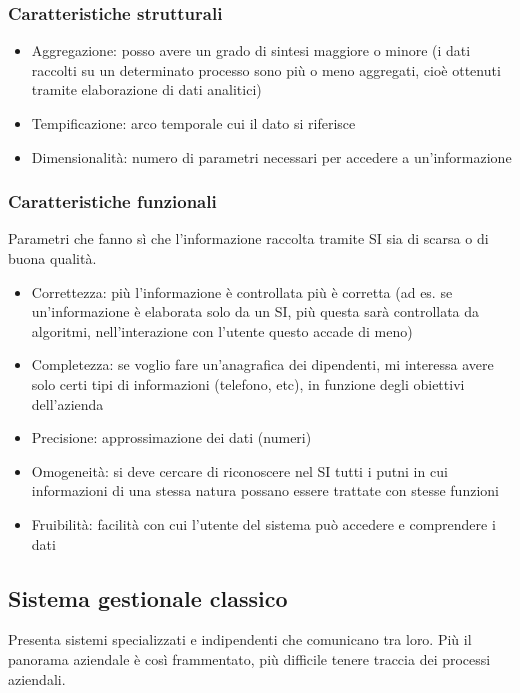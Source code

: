 \begin{itemize}
\subsubsection{Caratteristiche strutturali}
\label{subs:Caratteristiche strutturali}
\begin{itemize}
  \item Aggregazione: posso avere un grado di sintesi maggiore o minore
  (i dati raccolti su un determinato processo sono pi\`u o meno aggregati,
  cio\`e ottenuti tramite elaborazione di dati analitici)
  \item Tempificazione: arco temporale cui il dato si riferisce
  \item Dimensionalit\`a: numero di parametri necessari per accedere
  a un'informazione
\end{itemize}
\subsubsection{Caratteristiche funzionali}
\label{subs:Caratteristiche funzionali}
Parametri che fanno s\`i che l'informazione raccolta tramite SI sia di scarsa
o di buona qualit\`a.
\begin{itemize}
  \item Correttezza: pi\`u l'informazione \`e controllata pi\`u \`e corretta
  (ad es. se un'informazione \`e elaborata solo da un SI, pi\`u questa sar\`a
  controllata da algoritmi, nell'interazione con l'utente questo accade di meno)
  \item Completezza: se voglio fare un'anagrafica dei dipendenti, mi interessa avere solo certi
  tipi di informazioni (telefono, etc), in funzione degli obiettivi dell'azienda
  \item Precisione: approssimazione dei dati (numeri)
  \item Omogeneit\`a: si deve cercare di riconoscere nel SI tutti i putni in
  cui informazioni di una stessa natura possano essere trattate con stesse funzioni
  \item Fruibilit\`a: facilit\`a con cui l'utente del sistema pu\`o accedere e comprendere
  i dati
\end{itemize}
\subsection{Sistema gestionale classico}
\label{sub:Sistema gestionale classico}
Presenta sistemi specializzati e indipendenti che comunicano tra loro.
Pi\`u il panorama aziendale \`e cos\`i frammentato, pi\`u difficile tenere
traccia dei processi aziendali.

\end{itemize}
